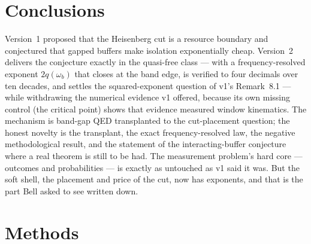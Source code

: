 \documentclass[11pt,a4paper]{article}
\theoremstyle{remark}
\begin{document}
\section{Conclusions}

Version~1 proposed that the Heisenberg cut is a resource boundary and conjectured that
gapped buffers make isolation exponentially cheap. Version~2 delivers the conjecture
exactly in the quasi-free class --- with a frequency-resolved exponent
$2q(\omega_b)$ that closes at the band edge, is verified to four decimals over ten
decades, and settles the squared-exponent question of v1's Remark~8.1 --- while
withdrawing the numerical evidence v1 offered, because its own missing control (the
critical point) shows that evidence measured window kinematics. The mechanism is
band-gap QED transplanted to the cut-placement question; the honest novelty is the
transplant, the exact frequency-resolved law, the negative methodological result, and the
statement of the interacting-buffer conjecture where a real theorem is still to be had.
The measurement problem's hard core --- outcomes and probabilities --- is exactly as
untouched as v1 said it was. But the soft shell, the placement and price of the cut, now
has exponents, and that is the part Bell asked to see written down.

\appendix

\section{Methods}
\label{app:methods}
\end{document}
